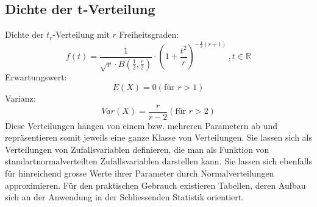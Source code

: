 \subsection{Dichte der t-Verteilung}\label{theorie:t_verteilung}
Dichte der $t_r$-Verteilung mit $r$ Freiheitsgraden:
\begin{equation}
f(t)=\frac{1}{\sqrt{r}\cdot B(\frac{1}{2},\frac{r}{2})}\cdot (1+\frac{t^2}{r})^{-\frac{1}{2}(r+1)}\, , t\in\mathbb{R}
\end{equation}
Erwartungswert:
\begin{equation}
E(X) = 0 (\mbox{für }r > 1)
\end{equation}
Varianz:
\begin{equation}
Var(X) =  \frac{r}{r-2} (\mbox{für }r>2)
\end{equation}
Diese Verteilungen hängen von einem bzw. mehreren Parametern ab und repräsentieren somit jeweils eine ganze Klasse von Verteilungen. Sie lassen sich als Verteilungen von Zufallsvariablen definieren, die man als Funktion von standartnormalverteilten Zufallsvariablen darstellen kann. Sie lassen sich ebenfalls für hinreichend grosse Werte ihrer Parameter durch Normalverteilungen approximieren. Für den praktischen Gebrauch existieren Tabellen, deren Aufbau sich an der Anwendung in der Schliessenden Statistik orientiert. 
